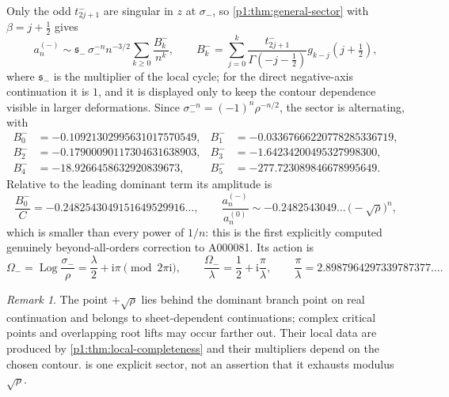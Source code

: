 \documentclass[11pt,a4paper,oneside]{book}
\theoremstyle{plain}
\theoremstyle{definition}
\theoremstyle{remark}
\newtheorem{remark}[theorem]{Remark}
\newcommand{\ii}{\mathrm{i}}
\begin{document}
Only the odd $t^-_{2j+1}$ are singular in $z$ at $\sigma_-$, so \cref{p1:thm:general-sector}
with $\beta=j+\tfrac12$ gives
\begin{equation}
 \boxed{\;
 a_n^{(-)}\sim\mathfrak s_-\,\sigma_-^{-n}n^{-3/2}
 \sum_{k\ge0}\frac{B^-_k}{n^{k}},
 \qquad
 B^-_k=\sum_{j=0}^{k}\frac{t^-_{2j+1}}{\Gamma(-j-\tfrac12)}
 g_{k-j}\!\left(j+\tfrac12\right),\;}
 \label{p1:eq:minus-sector}
\end{equation}
where $\mathfrak s_-$ is the multiplier of the local cycle; for the direct negative-axis
continuation it is $1$, and it is displayed only to keep the contour dependence visible in
larger deformations.  Since $\sigma_-^{-n}=(-1)^{n}\rho^{-n/2}$, the sector is alternating,
with
\begin{equation}
\begin{aligned}
 B^-_0&=-0.10921302995631017570549,&
 B^-_1&=-0.03367666220778285336719,\\
 B^-_2&=-0.17900090117304631638903,&
 B^-_3&=-1.64234200495327998300,\\
 B^-_4&=-18.9266458632920839673,&
 B^-_5&=-277.723089846678995649 .
\end{aligned}
\label{p1:eq:Bminus-numeric}
\end{equation}
Relative to the leading dominant term its amplitude is
\begin{equation}
 \frac{B^-_0}{C}=-0.2482543049151649529916\ldots,
 \qquad
 \frac{a_n^{(-)}}{a_n^{(0)}}\sim
 -0.2482543049\ldots\,\bigl(-\sqrt\rho\bigr)^{n},
 \label{p1:eq:minus-relative}
\end{equation}
which is smaller than every power of $1/n$: this is the first explicitly computed genuinely
beyond-all-orders correction to A000081.  Its action is
\begin{equation}
 \Omega_-=\operatorname{Log}\frac{\sigma_-}{\rho}
 =\frac\lambda2+\ii\pi \pmod{2\pi\ii},
 \qquad \frac{\Omega_-}{\lambda}=\frac12+\ii\frac{\pi}{\lambda},
 \qquad \frac\pi\lambda=2.8987964297339787377\ldots .
 \label{p1:eq:minus-action}
\end{equation}

\begin{remark}
\label{p1:rem:other-sectors}
The point $+\sqrt\rho$ lies behind the dominant branch point on real continuation and belongs
to sheet-dependent continuations; complex critical points and overlapping root lifts may occur
farther out.  Their local data are produced by \cref{p1:thm:local-completeness} and their
multipliers depend on the chosen contour.   is one explicit sector,
not an assertion that it exhausts modulus $\sqrt\rho$.
\end{remark}
\end{document}
